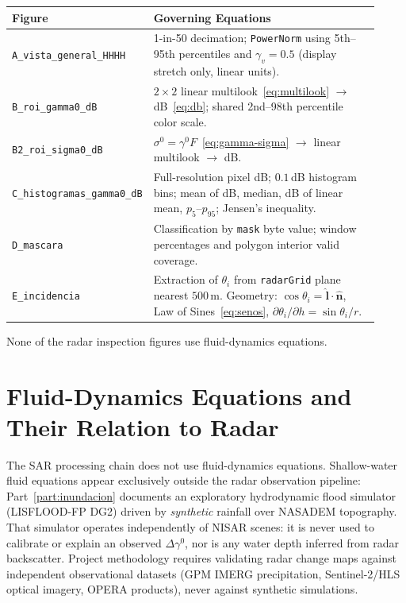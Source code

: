 \documentclass[11pt,a4paper]{article}
\newcommand{\flecha}{\ensuremath{\rightarrow}}
\begin{document}
\begin{longtable}{p{0.30\linewidth}p{0.62\linewidth}}
\toprule
\textbf{Figure} & \textbf{Governing Equations} \\
\midrule
\endhead
\texttt{A\_vista\_general\_HHHH} & 1-in-50 decimation; \texttt{PowerNorm} using 5th--95th percentiles and $\gamma_v = 0.5$ (display stretch only, linear units). \\
\texttt{B\_roi\_gamma0\_dB} & $2\times2$ linear multilook~\eqref{eq:multilook} \flecha{} dB~\eqref{eq:db}; shared 2nd--98th percentile color scale. \\
\texttt{B2\_roi\_sigma0\_dB} & $\sigma^0 = \gamma^0 F$~\eqref{eq:gamma-sigma} \flecha{} linear multilook \flecha{} dB. \\
\texttt{C\_histogramas\_gamma0\_dB} & Full-resolution pixel dB; $0.1$\,dB histogram bins; mean of dB, median, dB of linear mean, $p_5$--$p_{95}$; Jensen's inequality. \\
\texttt{D\_mascara} & Classification by \texttt{mask} byte value; window percentages and polygon interior valid coverage. \\
\texttt{E\_incidencia} & Extraction of $\theta_i$ from \texttt{radarGrid} plane nearest $500$\,m. Geometry: $\cos\theta_i = \hat{\mathbf{l}}\cdot\hat{\mathbf{n}}$, Law of Sines~\eqref{eq:senos}, $\partial\theta_i/\partial h = \sin\theta_i/r$. \\
\bottomrule
\end{longtable}

None of the radar inspection figures use fluid-dynamics equations.

\section{Fluid-Dynamics Equations and Their Relation to Radar}

The SAR processing chain does not use fluid-dynamics equations. Shallow-water fluid equations appear exclusively outside the radar observation pipeline: Part~\ref{part:inundacion} documents an exploratory hydrodynamic flood simulator (LISFLOOD-FP DG2) driven by \emph{synthetic} rainfall over NASADEM topography. That simulator operates independently of NISAR scenes: it is never used to calibrate or explain an observed $\Delta\gamma^0$, nor is any water depth inferred from radar backscatter. Project methodology requires validating radar change maps against independent observational datasets (GPM IMERG precipitation, Sentinel-2/HLS optical imagery, OPERA products), never against synthetic simulations.
\end{document}
